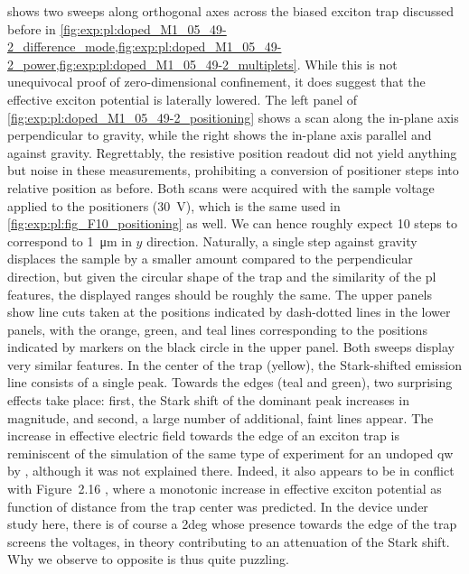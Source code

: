  shows two sweeps along orthogonal axes across the biased exciton trap discussed before in \cref{fig:exp:pl:doped_M1_05_49-2_difference_mode,fig:exp:pl:doped_M1_05_49-2_power,fig:exp:pl:doped_M1_05_49-2_multiplets}.
While this is not unequivocal proof of zero-dimensional confinement, it does suggest that the effective exciton potential is laterally lowered.
The left panel of \cref{fig:exp:pl:doped_M1_05_49-2_positioning} shows a scan along the in-plane axis perpendicular to gravity, while the right shows the in-plane axis parallel and against gravity.
Regrettably, the resistive position readout did not yield anything but noise in these measurements, prohibiting a conversion of positioner steps into relative position as before.
Both scans were acquired with the sample voltage applied to the positioners (\qty{30}{\volt}), which is the same used in \cref{fig:exp:pl:fig_F10_positioning} as well.
We can hence roughly expect \num{10} steps to correspond to \qty{1}{\micro\meter} in $y$ direction.
Naturally, a single step against gravity displaces the sample by a smaller amount compared to the perpendicular direction, but given the circular shape of the trap and the similarity of the \gls{pl} features, the displayed ranges should be roughly the same.
The upper panels show line cuts taken at the positions indicated by dash-dotted lines in the lower panels, with the orange, green, and teal lines corresponding to the positions indicated by markers on the black circle in the upper panel.
Both sweeps display very similar features.
In the center of the trap (yellow), the Stark-shifted emission line consists of a single peak.
Towards the edges (teal and green), two surprising effects take place: first, the Stark shift of the dominant peak increases in magnitude, and second, a large number of additional, faint lines appear.
The increase in effective electric field towards the edge of an exciton trap is reminiscent of the simulation of the same type of experiment for an undoped \gls{qw} by \citet[Figure~6.4]{Descamps2021}, although it was not explained there.
Indeed, it also appears to be in conflict with Figure~2.16 \ibid, where a monotonic increase in effective exciton potential as function of distance from the trap center was predicted.
In the device under study here, there is of course a \gls{2deg} whose presence towards the edge of the trap screens the voltages, in theory contributing to an attenuation of the Stark shift.
Why we observe to opposite is thus quite puzzling.

